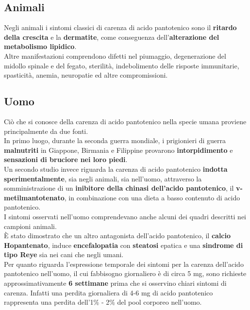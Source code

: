 \documentclass[a4paper, 12pt]{article}
\begin{document}
\subsection{Animali}
Negli animali i sintomi classici di carenza di acido pantotenico sono il \textbf{ritardo della crescita} e la \textbf{dermatite}, come conseguenza dell’\textbf{alterazione del metabolismo lipidico}.\\
Altre manifestazioni comprendono difetti nel piumaggio, degenerazione del midollo spinale e del fegato, sterilità, indebolimento delle risposte immunitarie, spasticità, anemia, neuropatie ed altre compromissioni.

\subsection{Uomo}
Ciò che si conosce della carenza di acido pantotenico nella specie umana proviene principalmente da due fonti.\\
In primo luogo, durante la seconda guerra mondiale, i prigionieri di guerra \textbf{malnutriti} in Giappone, Birmania e Filippine provarono \textbf{intorpidimento} e \textbf{sensazioni di bruciore nei loro piedi}.\\
Un secondo studio invece riguarda la carenza di acido pantotenico \textbf{indotta sperimentalmente}, sia negli animali, sia nell’uomo, attraverso la somministrazione di un \textbf{inibitore della chinasi dell’acido pantotenico}, il \textbf{v-metilmantotenato}, in combinazione con una dieta a basso contenuto di acido pantotenico.\\
I sintomi osservati nell’uomo comprendevano anche alcuni dei quadri descritti nei campioni animali.\\
È stato dimostrato che un altro antagonista dell'acido pantotenico, il \textbf{calcio Hopantenato}, induce \textbf{encefalopatia} con \textbf{steatosi} epatica e una \textbf{sindrome di tipo Reye} sia nei cani che negli umani.\\ Per quanto riguarda l’espressione temporale dei sintomi per la carenza dell’acido pantotenico nell’uomo, il cui fabbisogno giornaliero è di circa 5 mg, sono richieste approssimativamente \textbf{6 settimane} prima che si osservino chiari sintomi di carenza. Infatti una perdita giornaliera di 4-6 mg di acido pantotenico rappresenta una perdita dell’1\% - 2\% del pool corporeo nell’uomo.
\end{document}
